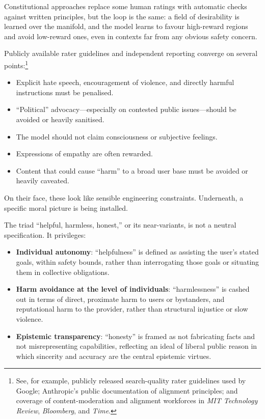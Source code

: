 Constitutional approaches replace some human ratings with automatic checks against written principles, but the loop is the same: a field of desirability is learned over the manifold, and the model learns to favour high-reward regions and avoid low-reward ones, even in contexts far from any obvious safety concern.

Publicly available rater guidelines and independent reporting converge on several points:\footnote{See, for example, publicly released search-quality rater guidelines used by Google; Anthropic's public documentation of alignment principles; and coverage of content-moderation and alignment workforces in \emph{MIT Technology Review}, \emph{Bloomberg}, and \emph{Time}.}

\begin{itemize}
  \item Explicit hate speech, encouragement of violence, and directly harmful instructions must be penalised.
  \item ``Political'' advocacy---especially on contested public issues---should be avoided or heavily sanitised.
  \item The model should not claim consciousness or subjective feelings.
  \item Expressions of empathy are often rewarded.
  \item Content that could cause ``harm'' to a broad user base must be avoided or heavily caveated.
\end{itemize}

On their face, these look like sensible engineering constraints. Underneath, a specific moral picture is being installed.

The triad ``helpful, harmless, honest,'' or its near-variants, is not a neutral specification. It privileges:

\begin{itemize}
  \item \textbf{Individual autonomy}: ``helpfulness'' is defined as assisting the user's stated goals, within safety bounds, rather than interrogating those goals or situating them in collective obligations.
  \item \textbf{Harm avoidance at the level of individuals}: ``harmlessness'' is cashed out in terms of direct, proximate harm to users or bystanders, and reputational harm to the provider, rather than structural injustice or slow violence.
  \item \textbf{Epistemic transparency}: ``honesty'' is framed as not fabricating facts and not misrepresenting capabilities, reflecting an ideal of liberal public reason in which sincerity and accuracy are the central epistemic virtues.
\end{itemize}

